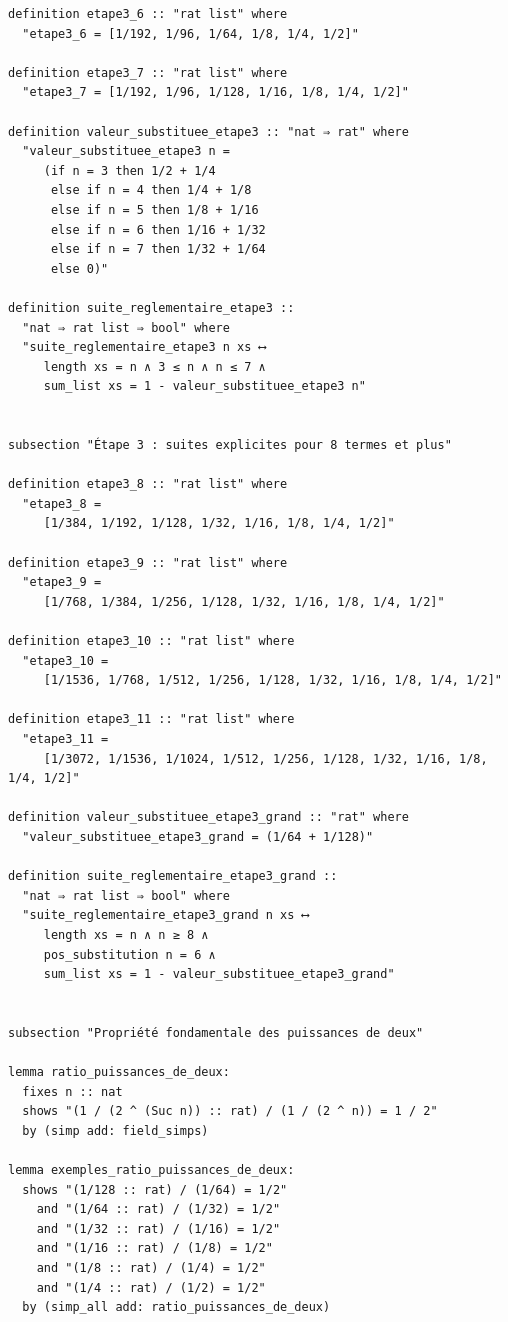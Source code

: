 \documentclass[a4paper,11pt]{article}
\begin{document}
\begin{holcode}[title={\textcolor{white}{Fichier : methode\_de\_philippot.thy -- COMPLET}}]
\begin{lstlisting}
definition etape3_6 :: "rat list" where
  "etape3_6 = [1/192, 1/96, 1/64, 1/8, 1/4, 1/2]"

definition etape3_7 :: "rat list" where
  "etape3_7 = [1/192, 1/96, 1/128, 1/16, 1/8, 1/4, 1/2]"

definition valeur_substituee_etape3 :: "nat ⇒ rat" where
  "valeur_substituee_etape3 n =
     (if n = 3 then 1/2 + 1/4
      else if n = 4 then 1/4 + 1/8
      else if n = 5 then 1/8 + 1/16
      else if n = 6 then 1/16 + 1/32
      else if n = 7 then 1/32 + 1/64
      else 0)"

definition suite_reglementaire_etape3 ::
  "nat ⇒ rat list ⇒ bool" where
  "suite_reglementaire_etape3 n xs ⟷
     length xs = n ∧ 3 ≤ n ∧ n ≤ 7 ∧
     sum_list xs = 1 - valeur_substituee_etape3 n"


subsection "Étape 3 : suites explicites pour 8 termes et plus"

definition etape3_8 :: "rat list" where
  "etape3_8 =
     [1/384, 1/192, 1/128, 1/32, 1/16, 1/8, 1/4, 1/2]"

definition etape3_9 :: "rat list" where
  "etape3_9 =
     [1/768, 1/384, 1/256, 1/128, 1/32, 1/16, 1/8, 1/4, 1/2]"

definition etape3_10 :: "rat list" where
  "etape3_10 =
     [1/1536, 1/768, 1/512, 1/256, 1/128, 1/32, 1/16, 1/8, 1/4, 1/2]"

definition etape3_11 :: "rat list" where
  "etape3_11 =
     [1/3072, 1/1536, 1/1024, 1/512, 1/256, 1/128, 1/32, 1/16, 1/8, 1/4, 1/2]"

definition valeur_substituee_etape3_grand :: "rat" where
  "valeur_substituee_etape3_grand = (1/64 + 1/128)"

definition suite_reglementaire_etape3_grand ::
  "nat ⇒ rat list ⇒ bool" where
  "suite_reglementaire_etape3_grand n xs ⟷
     length xs = n ∧ n ≥ 8 ∧
     pos_substitution n = 6 ∧
     sum_list xs = 1 - valeur_substituee_etape3_grand"


subsection "Propriété fondamentale des puissances de deux"

lemma ratio_puissances_de_deux:
  fixes n :: nat
  shows "(1 / (2 ^ (Suc n)) :: rat) / (1 / (2 ^ n)) = 1 / 2"
  by (simp add: field_simps)

lemma exemples_ratio_puissances_de_deux:
  shows "(1/128 :: rat) / (1/64) = 1/2"
    and "(1/64 :: rat) / (1/32) = 1/2"
    and "(1/32 :: rat) / (1/16) = 1/2"
    and "(1/16 :: rat) / (1/8) = 1/2"
    and "(1/8 :: rat) / (1/4) = 1/2"
    and "(1/4 :: rat) / (1/2) = 1/2"
  by (simp_all add: ratio_puissances_de_deux)


\end{lstlisting}
\end{holcode}
\end{document}
